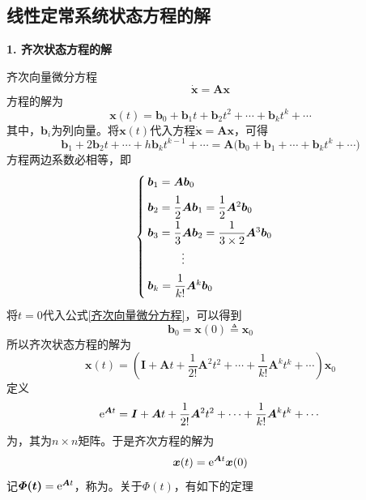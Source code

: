 \vspace*{1em}

\subsection{线性定常系统状态方程的解}
\noindent \textbf{1. 齐次状态方程的解}

齐次向量微分方程
\begin{equation}
	\dot{\bm{x}}=\bm{Ax}
\end{equation}
方程的解为
\begin{equation}
	\bm{x}(t) = \bm{b}_0+\bm{b}_1t + \bm{b}_2t^2 + \cdots + \bm{b}_kt^k + \cdots
	\label{齐次向量微分方程}
\end{equation}
其中，$\bm{b}_i$为列向量。将$\bm{x}(t)$代入方程$\dot{\bm{x}}=\bm{Ax}$，可得
\begin{equation}
	\bm{b}_1 + 2\bm{b}_2t + \cdots + h\bm{b}_kt^{k-1} + \cdots = \bm{A}\big(\bm{b}_0 + \bm{b}_1 + \cdots + \bm{b}_kt^k + \cdots\big)
\end{equation}
方程两边系数必相等，即
\begin{equation}
	\begin{cases}
		\, \bm{b}_1 = \bm{Ab}_0\\[0.5em]
		\, \bm{b}_2 = \dfrac{1}{2}\bm{Ab}_1=\dfrac{1}{2}\bm{A}^2\bm{b}_0\\[0.5em]
		\, \bm{b}_3 = \dfrac{1}{3}\bm{Ab}_2 = \dfrac{1}{3\times 2}\bm{A}^3\bm{b}_0\\[0.5em]
		\, \hspace*{3em}\vdots\\[0.5em]
		\, \bm{b}_k = \dfrac{1}{k!}\bm{A}^k\bm{b}_0\\[0.5em]
	\end{cases}
\end{equation}
将$t=0$代入公式\eqref{齐次向量微分方程}，可以得到
\begin{equation}
	\bm{b}_0 = \bm{x}(0) \triangleq \bm{x}_0
\end{equation}
所以齐次状态方程的解为
\begin{equation}
	\bm{x}(t) = \left(\bm{I} + \bm{A}t + \dfrac{1}{2!}\bm{A}^2t^2 + \cdots + \dfrac{1}{k!}\bm{A}^kt^k+ \cdots\right)\bm{x}_0
\end{equation}
定义
\begin{equation}
	{\rm{e}}^{\bm{A}t} = \bm{I} + \bm{A}t + \dfrac{1}{2!}\bm{A}^2t^2 + \cdots + \dfrac{1}{k!}\bm{A}^kt^k+ \cdots
\end{equation}
为，其为$n \times n$矩阵。于是齐次方程的解为
\begin{equation}
	\bm{x}(t) = {\rm{e}}^{\bm{A}t}\bm{x}(0)
\end{equation}
记$\bm{\varPhi(t)}={\rm{e}}^{\bm{A}t}$，称为。关于$\bm{\varPhi}(t)$，有如下的定理

